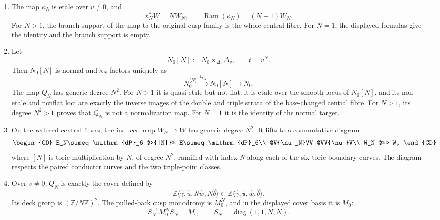 \begin{theorem}
\begin{enumerate}
\item The map $\kappa_N$ is etale over $v\ne0$, and
\begin{equation}
 \kappa_N^*W=NW_N,
 \qquad
 \operatorname{Ram}(\kappa_N)=(N-1)W_N.
 \label{wb:cusp-cover-direct-ramification}
\end{equation}
For $N>1$, the branch support of the map to the original cusp family
is the whole central fibre. For $N=1$, the displayed formulas give the identity and the branch support is empty.

\item Let
\begin{equation}
 N_0[N]:=N_0\times_{\Delta_t}\Delta_v,
 \qquad t=v^N.
 \label{wb:cusp-cover-base-changed-target}
\end{equation}
Then $N_0[N]$ is normal and $\kappa_N$ factors uniquely as
\begin{equation}
 N_0^{\langle N\rangle}
 \xrightarrow{\ Q_N\ }N_0[N]
 \longrightarrow N_0.
 \label{wb:cusp-cover-relative-factorization}
\end{equation}
The map $Q_N$ has generic degree $N^2$.  For $N>1$ it is quasi-etale but
not flat: it is etale over the smooth locus of $N_0[N]$, and its non-etale
and nonflat loci are exactly the inverse images of the double and triple
strata of the base-changed central fibre.  For $N>1$, its degree $N^2>1$ proves that $Q_N$ is not a
normalization map. For $N=1$ it is the identity of the normal target.

\item On the reduced central fibres, the induced map
$W_N\to W$ has generic degree $N^2$.  It lifts to a commutative diagram
\begin{equation}
\begin{CD}
 E_N\simeq\mathrm{dP}_6 @>{[N]}>> E\simeq\mathrm{dP}_6\\
 @V{\nu_N}VV @VV{\nu}V\\
 W_N @>>> W,
\end{CD}
 \label{wb:cusp-cover-normalization-diagram}
\end{equation}
where $[N]$ is toric multiplication by $N$, of degree $N^2$, ramified
with index $N$ along each of the six toric boundary curves.  The diagram
respects the paired conductor curves and the two triple-point classes.

\item Over $v\ne0$, $Q_N$ is exactly the cover defined by
\[
 \mathbb Z\langle\widehat\gamma,\widehat u,
 N\widehat w,N\widehat\delta\rangle
 \subset
 \mathbb Z\langle\widehat\gamma,\widehat u,
 \widehat w,\widehat\delta\rangle.
\]
Its deck group is $(\mathbb Z/N\mathbb Z)^2$.  The pulled-back cusp
monodromy is $M_0^N$, and in the displayed cover basis it is $M_0$:
\begin{equation}
 S_N^{-1}M_0^NS_N=M_0,\qquad
 S_N=\operatorname{diag}(1,1,N,N).
 \label{wb:cusp-cover-monodromy-conjugacy}
\end{equation}
\end{enumerate}
\end{theorem}



